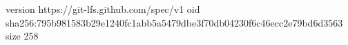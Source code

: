 version https://git-lfs.github.com/spec/v1
oid sha256:795b981583b29e1240fc1abb5a5479dbe3f70db04230f6c46ecc2e79bd6d3563
size 258
